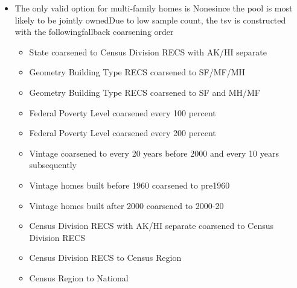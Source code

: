 \begin{itemize}
\item The only valid option for multi-family homes is Nonesince the pool is most likely to be jointly ownedDue to low sample count, the tsv is constructed with the followingfallback coarsening order
  \begin{itemize}
  \item [1] State coarsened to Census Division RECS with AK/HI separate
  \item [2] Geometry Building Type RECS coarsened to SF/MF/MH
  \item [3] Geometry Building Type RECS coarsened to SF and MH/MF
  \item [4] Federal Poverty Level coarsened every 100 percent
  \item [5] Federal Poverty Level coarsened every 200 percent
  \item [6] Vintage coarsened to every 20 years before 2000 and every 10 years subsequently
  \item [7] Vintage homes built before 1960 coarsened to pre1960
  \item [8] Vintage homes built after 2000 coarsened to 2000-20
  \item [9] Census Division RECS with AK/HI separate coarsened to Census Division RECS
  \item [10] Census Division RECS to Census Region
  \item [11] Census Region to National
  \end{itemize}
\end{itemize}
